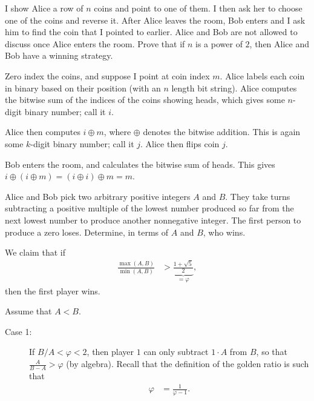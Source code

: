 \documentclass[10pt]{mypackage}
\begin{document}
\begin{problem}
  I show Alice a row of $n$ coins and point to one of them. I then ask her to choose one of the coins and reverse it. After Alice leaves the room, Bob enters and I ask him to find the coin that I pointed to earlier. Alice and Bob are not allowed to discuss once Alice enters the room. Prove that if $n$ is a power of $2$, then Alice and Bob have a winning strategy.
\end{problem}
\begin{solution}
  Zero index the coins, and suppose I point at coin index $m$. Alice labels each coin in binary based on their position (with an $n$ length bit string). Alice computes the bitwise sum of the indices of the coins showing heads, which gives some $n$-digit binary number; call it $i$.\newline

  Alice then computes $i\oplus m$, where $\oplus$ denotes the bitwise addition. This is again some $k$-digit binary number; call it $j$. Alice then flips coin $j$.\newline

  Bob enters the room, and calculates the bitwise sum of heads. This gives $i\oplus \left( i\oplus m \right)= \left( i\oplus i \right)\oplus m= m$.
\end{solution}
\begin{problem}
  Alice and Bob pick two arbitrary positive integers $A$ and $B$. They take turns subtracting a positive multiple of the lowest number produced so far from the next lowest number to produce another nonnegative integer. The first person to produce a zero loses. Determine, in terms of $A$ and $B$, who wins.
\end{problem}
\begin{solution}
  We claim that if
  \begin{align*}
    \frac{\max\left( A,B \right)}{ \min\left( A,B \right) } &> \underbrace{\frac{1 + \sqrt{5}}{2}}_{=\varphi},
  \end{align*}
  then the first player wins.\newline

  Assume that $A < B$.
  \begin{description}
    \item[Case 1:] If $B/A < \varphi < 2$, then player $1$ can only subtract $1\cdot A$ from $B$, so that $\frac{A}{B-A} > \varphi$ (by algebra). Recall that the definition of the golden ratio is such that
      \begin{align*}
        \varphi &= \frac{1}{\varphi-1}.
      \end{align*}
  \end{description}
\end{solution}
\end{document}
